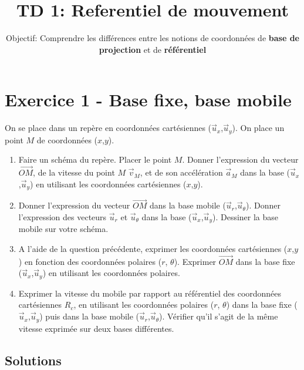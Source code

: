 \documentclass[
  12pt,
]{article}
\title{TD 1: Referentiel de mouvement}
\subtitle{Objectif: Comprendre les différences entre les notions de
coordonnées de \textbf{base de projection} et de \textbf{référentiel}}
\author{}
\date{}
\begin{document}
\maketitle
\ifdefined\Shaded\renewenvironment{Shaded}{\begin{tcolorbox}[frame hidden, enhanced, interior hidden, borderline west={3pt}{0pt}{shadecolor}, boxrule=0pt, breakable, sharp corners]}{\end{tcolorbox}}\fi

\thispagestyle{fancy}

\hypertarget{exercice-1---base-fixe-base-mobile}{%
\section{Exercice 1 - Base fixe, base
mobile}\label{exercice-1---base-fixe-base-mobile}}

On se place dans un repère en coordonnées cartésiennes
(\(\vec u_x\),\(\vec u_y\)). On place un point \(M\) de coordonnées
(\(x\),\(y\)).

\begin{enumerate}
\def\labelenumi{\arabic{enumi}.}
\item
  Faire un schéma du repère. Placer le point \(M\). Donner l'expression
  du vecteur \(\vec{OM}\), de la vitesse du point \(M\) \(\vec v_M\), et
  de son accélération \(\vec a_M\) dans la base
  (\(\vec u_x\),\(\vec u_y\)) en utilisant les coordonnées cartésiennes
  (\(x\),\(y\)).
\item
  Donner l'expression du vecteur \(\vec{OM}\) dans la base mobile
  (\(\vec u_r\),\(\vec u_\theta\)). Donner l'expression des vecteurs
  \(\vec u_r\) et \(\vec u_\theta\) dans la base
  (\(\vec u_x\),\(\vec u_y\)). Dessiner la base mobile sur votre schéma.
\item
  A l'aide de la question précédente, exprimer les coordonnées
  cartésiennes (\(x\),\(y\)) en fonction des coordonnées polaires
  (\(r\), \(\theta\)). Exprimer \(\vec{OM}\) dans la base fixe
  (\(\vec u_x\),\(\vec u_y\)) en utilisant les coordonnées polaires.
\item
  Exprimer la vitesse du mobile par rapport au référentiel des
  coordonnées cartésiennes \(R_c\), en utilisant les coordonnées
  polaires (\(r\), \(\theta\)) dans la base fixe
  (\(\vec u_x\),\(\vec u_y\)) puis dans la base mobile
  (\(\vec u_r\),\(\vec u_\theta\)). Vérifier qu'il s'agit de la même
  vitesse exprimée sur deux bases différentes.
\end{enumerate}

\hypertarget{solutions}{%
\subsection{Solutions}\label{solutions}}
\end{document}

